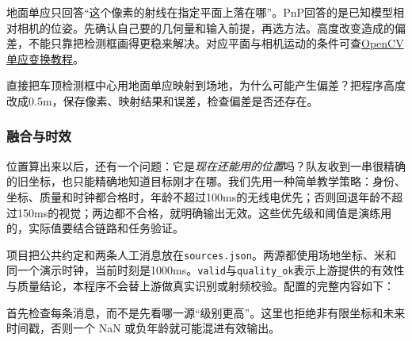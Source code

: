 \begin{conclusion}
地面单应只回答“这个像素的射线在指定平面上落在哪”。PnP回答的是已知模型相对相机的位姿。先确认自己要的几何量和输入前提，再选方法。高度改变造成的偏差，不能只靠把检测框画得更稳来解决。对应平面与相机运动的条件可查\href{https://docs.opencv.org/4.x/d9/dab/tutorial_homography.html}{OpenCV 单应变换教程}。
\end{conclusion}

\begin{exercise}
\label{v3-ex-radar-3}
直接把车顶检测框中心用地面单应映射到场地，为什么可能产生偏差？把程序高度改成0.5m，保存像素、映射结果和误差，检查偏差是否还存在。
\end{exercise}

\subsubsection{融合与时效}

位置算出来以后，还有一个问题：它是\emph{现在还能用的位置}吗？队友收到一串很精确的旧坐标，也只能精确地知道目标刚才在哪。我们先用一种简单教学策略：身份、坐标、质量和时钟都合格时，年龄不超过100ms的无线电优先；否则回退年龄不超过150ms的视觉；两边都不合格，就明确输出无效。这些优先级和阈值是演练用的，实际值要结合链路和任务验证。

项目把公共约定和两条人工消息放在\texttt{sources.json}。两源都使用场地坐标、米和同一个演示时钟，当前时刻是1000ms。\texttt{valid}与\texttt{quality\_ok}表示上游提供的有效性与质量结论，本程序不会替上游做真实识别或射频校验。配置的完整内容如下：

\par\vspace{6pt}
\noindent\begin{minipage}[t]{\linewidth}

\end{minipage}\par\vspace{6pt}


首先检查每条消息，而不是先看哪一源“级别更高”。这里也拒绝非有限坐标和未来时间戳，否则一个 NaN 或负年龄就可能混进有效输出。

\par\vspace{6pt}
\noindent\begin{minipage}[t]{\linewidth}

\end{minipage}\par\vspace{6pt}

